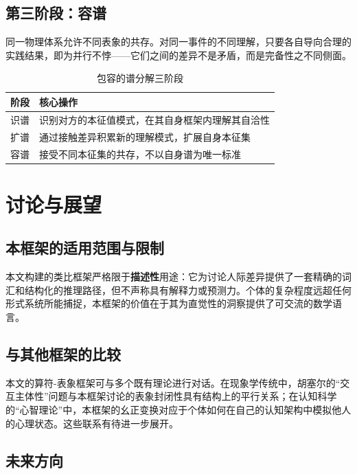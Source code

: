 ﻿\documentclass[12pt,a4paper]{ctexart}
\begin{document}
\subsection*{第三阶段：容谱}

同一物理体系允许不同表象的共存。对同一事件的不同理解，只要各自导向合理的实践结果，即为并行不悖——它们之间的差异不是矛盾，而是完备性之不同侧面。

\begin{table}[h]
\centering
\caption{包容的谱分解三阶段}
\begin{tabularx}{\textwidth}{cX}
\toprule
\textbf{阶段} & \textbf{核心操作} \\
\midrule
识谱 & 识别对方的本征值模式，在其自身框架内理解其自洽性 \\
扩谱 & 通过接触差异积累新的理解模式，扩展自身本征集 \\
容谱 & 接受不同本征集的共存，不以自身谱为唯一标准 \\
\bottomrule
\end{tabularx}
\end{table}

\section{讨论与展望}

\subsection{本框架的适用范围与限制}

本文构建的类比框架严格限于\textbf{描述性}用途：它为讨论人际差异提供了一套精确的词汇和结构化的推理路径，但不声称具有解释力或预测力。个体的复杂程度远超任何形式系统所能捕捉，本框架的价值在于其为直觉性的洞察提供了可交流的数学语言。

\subsection{与其他框架的比较}

本文的算符-表象框架可与多个既有理论进行对话。在现象学传统中，胡塞尔的``交互主体性''问题与本框架讨论的表象封闭性具有结构上的平行关系；在认知科学的``心智理论''中，本框架的幺正变换对应于个体如何在自己的认知架构中模拟他人的心理状态。这些联系有待进一步展开。

\subsection{未来方向}
\end{document}
